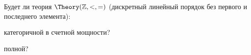 Будет ли теория $\Theory(\mathbb{Z}, <, =)$ (дискретный линейный порядок без первого и последнего
элемента):
\begin{enumcyr}
    \item категоричной в счетной мощности?
    \item полной?
\end{enumcyr}